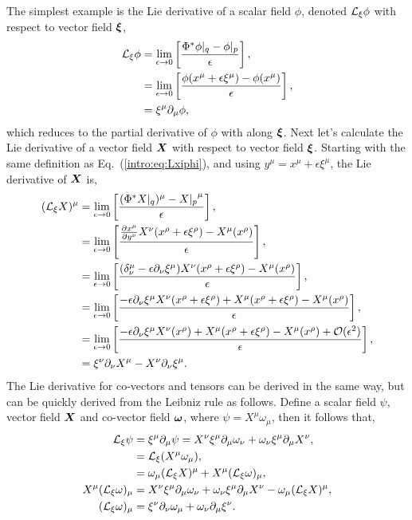 The simplest example is the Lie derivative of a scalar field $\phi$, denoted $\mathcal{L}_\xi \phi$ with respect to vector field $\boldsymbol \xi$,
\begin{align} \label{intro:eq:Lxiphi}
\mathcal{L}_\xi \phi &= \lim_{\epsilon \rightarrow 0}\left[\frac{\Phi^*\phi\vert_q - \phi\vert_p}{\epsilon} \right] , \\
&= \lim_{\epsilon \rightarrow 0}\left[\frac{\phi(x^\mu + \epsilon \xi^\mu) - \phi(x^\mu)}{\epsilon} \right] , \\
&= \xi^\mu \partial_\mu \phi,
\end{align}
which reduces to the partial derivative of $\phi$ with along $\boldsymbol{\xi}$. Next let's calculate the Lie derivative of a vector field $\boldsymbol{X}$ with respect to vector field $\boldsymbol\xi$. Starting with the same definition as Eq.~(\ref{intro:eq:Lxiphi}), and using $y^\mu = x^\mu + \epsilon \xi^\mu$, the Lie derivative of $\boldsymbol X$ is, 
\begin{align} 
(\mathcal{L}_\xi {X})^\mu &= \lim_{\epsilon \rightarrow 0}\left[\frac{(\Phi^*X\vert_q)^\mu - {X\vert_p}^\mu}{\epsilon} \right] , \\
&= \lim_{\epsilon \rightarrow 0}\left[\frac{ \frac{\partial x^\mu}{\partial y^\nu}X^\nu(x^\rho + \epsilon \xi^\rho) - X^\mu(x^\rho)}{\epsilon} \right] , \\
&= \lim_{\epsilon \rightarrow 0}\left[\frac{ (\delta_\nu^\mu - \epsilon \partial_\nu \xi^\mu)X^\nu(x^\rho + \epsilon \xi^\rho) - X^\mu(x^\rho)}{\epsilon} \right] , \\
&= \lim_{\epsilon \rightarrow 0}\left[\frac{ - \epsilon \partial_\nu \xi^\mu X^\nu(x^\rho + \epsilon \xi^\rho)+ X^\mu(x^\rho + \epsilon \xi^\rho) - X^\mu(x^\rho)}{\epsilon}  \right] , \\
&= \lim_{\epsilon \rightarrow 0}\left[\frac{ - \epsilon \partial_\nu \xi^\mu X^\nu(x^\rho)+ X^\mu(x^\rho + \epsilon \xi^\rho) - X^\mu(x^\rho)+\mathcal{O}(\epsilon^2)}{\epsilon}  \right] , \\
&= \xi^\nu \partial_\nu X^\mu - X^\nu \partial_\nu \xi^\mu.
\end{align}
The Lie derivative for co-vectors and tensors can be derived in the same way, but can be quickly derived from the Leibniz rule as follows. Define a scalar field $\psi$, vector field $\boldsymbol{X}$ and co-vector field $\boldsymbol\omega$, where $\psi = X^\mu \omega_\mu$, then it follows that,
\begin{align}
\mathcal{L}_\xi \psi &= \xi^\mu \partial_\mu \psi =  X^\nu\xi^\mu\partial_\mu\omega_\nu+\omega_\nu\xi^\mu\partial_\mu X^\nu, \\
              &= \mathcal{L}_\xi (X^\mu \omega_\mu),\\
              &= \omega_\mu (\mathcal{L}_\xi X)^\mu + X^\mu(\mathcal{L}_\xi\omega)_\mu,\\
               X^\mu(\mathcal{L}_\xi \omega)_\mu & =X^\nu\xi^\mu\partial_\mu\omega_\nu+\omega_\nu\xi^\mu\partial_\mu X^\nu-\omega_\mu (\mathcal{L}_\xi X)^\mu, \\
               (\mathcal{L}_\xi \omega)_\mu&= \xi^\nu \partial_\nu \omega_\mu + \omega_\nu \partial_\mu \xi^\nu.
\end{align}
